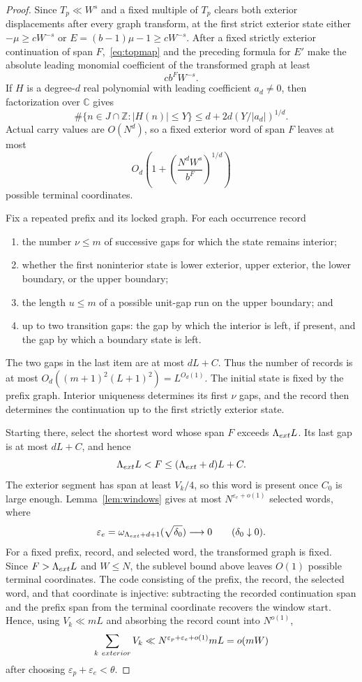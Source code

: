 \documentclass[10pt,a4paper]{amsart}
\newcommand{\Z}{\mathbb Z}
\begin{document}
\begin{proof}
Since $T_p\ll W^s$ and a fixed multiple of $T_p$ clears both exterior
displacements after every graph transform, at the first strict exterior state
either
$-\mu\ge cW^{-s}$ or $E=(b-1)\mu-1\ge cW^{-s}$. After a fixed
strictly exterior continuation of span $F$,~\eqref{eq:topmap} and the
preceding formula for $E'$ make the absolute leading monomial coefficient of
the transformed graph at least
\[
 cb^FW^{-s}.
\]
If $H$ is a degree-$d$ real polynomial with leading coefficient $a_d\ne0$,
then factorization over $\mathbb C$ gives
\begin{equation}\label{eq:sublevel}
 \#\{n\in J\cap\Z:|H(n)|\le Y\}
 \le d+2d(Y/|a_d|)^{1/d}.
\end{equation}
Actual carry values are $O(N^d)$, so a fixed exterior word of span $F$
leaves at most
\[
 O_d\left(1+\left(\frac{N^dW^s}{b^F}\right)^{1/d}\right)
\]
possible terminal coordinates.

Fix a repeated prefix and its locked graph. For each occurrence record
\begin{enumerate}
\item the number $\nu\le m$ of successive gaps for which the state remains
interior;
\item whether the first noninterior state is lower exterior, upper exterior,
the lower boundary, or the upper boundary;
\item the length $u\le m$ of a possible unit-gap run on the upper boundary;
and
\item up to two transition gaps: the gap by which the interior is left, if
present, and the gap by which a boundary state is left.
\end{enumerate}
The two gaps in the last item are at most $dL+C$. Thus the number of records is
at most $O_d((m+1)^2(L+1)^2)=L^{O_d(1)}$. The initial state is fixed by the
prefix graph. Interior uniqueness determines its first $\nu$ gaps, and the
record then determines the continuation up to the first strictly exterior
state.

Starting there, select the shortest word whose span $F$ exceeds
$\Lambda_{\rm ext}L$. Its last gap is at most $dL+C$, and hence
\[
 \Lambda_{\rm ext}L<F\le(\Lambda_{\rm ext}+d)L+C.
\]
The exterior segment has span at least $V_k/4$, so this word is present once
$C_0$ is large enough. Lemma~\ref{lem:windows} gives at
most $N^{\varepsilon_e+o(1)}$ selected words, where
\[
 \varepsilon_e=
 \omega_{\Lambda_{\rm ext}+d+1}(\sqrt{\delta_0})
 \longrightarrow0\qquad(\delta_0\downarrow0).
\]
For a fixed prefix, record, and selected word, the transformed graph is fixed.
Since $F>\Lambda_{\rm ext}L$ and $W\le N$, the sublevel bound above leaves
$O(1)$ possible terminal coordinates. The code consisting of the prefix, the
record, the selected word, and that coordinate is injective: subtracting the
recorded continuation span and the prefix span from the terminal coordinate
recovers the window start. Hence, using $V_k\ll mL$ and absorbing the record
count into $N^{o(1)}$,
\[
 \sum_{k\ {\rm exterior}}V_k
 \ll N^{\varepsilon_p+\varepsilon_e+o(1)}mL=o(mW)
\]
after choosing $\varepsilon_p+\varepsilon_e<\theta$.
\end{proof}
\end{document}
